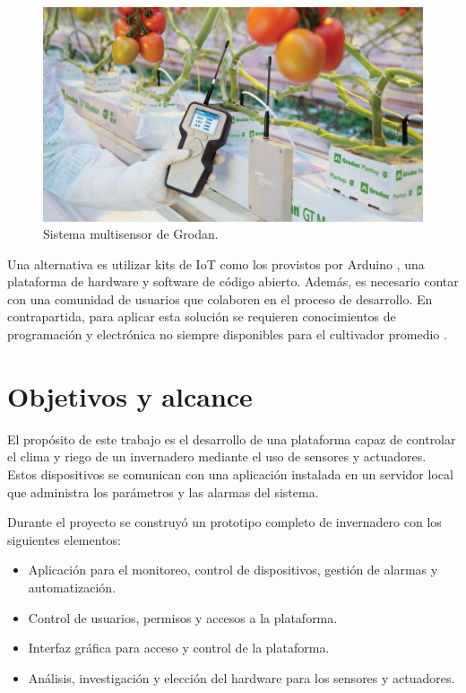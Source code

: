 \begin{figure}[hb]
\centering 
\includegraphics[width=.5\textwidth]{../Figures/grodan.jpg}
\caption[Sistema multisensor de Grodan]{Sistema multisensor de Grodan\protect\footnotemark.}
\label{fig:growlink}
\end{figure}



Una alternativa es utilizar kits de IoT como los provistos por Arduino \citep{arduino}, una plataforma de hardware y software de código abierto. Además, es necesario contar con una comunidad de usuarios que colaboren en el proceso de desarrollo. En contrapartida, para aplicar esta solución se requieren conocimientos de programación y electrónica no siempre disponibles para el cultivador promedio \citep{digger:1}. \\



\section{Objetivos y alcance}
\label{sec:objetivos}

El propósito de este trabajo es el desarrollo de una plataforma capaz de controlar el clima y riego de un invernadero mediante el uso de sensores y actuadores. Estos dispositivos se comunican con una aplicación instalada en un servidor local que administra los parámetros y las alarmas del sistema.

Durante el proyecto se construyó un prototipo completo de invernadero con los siguientes elementos:
 
\begin{itemize}
	\item Aplicación para el monitoreo, control de dispositivos, gestión de alarmas y automatización.
	\item Control de usuarios, permisos y accesos a la plataforma.
	\item Interfaz gráfica para acceso y control de la plataforma.
	\item Análisis, investigación y elección del hardware para los sensores y actuadores.


\end{itemize}


